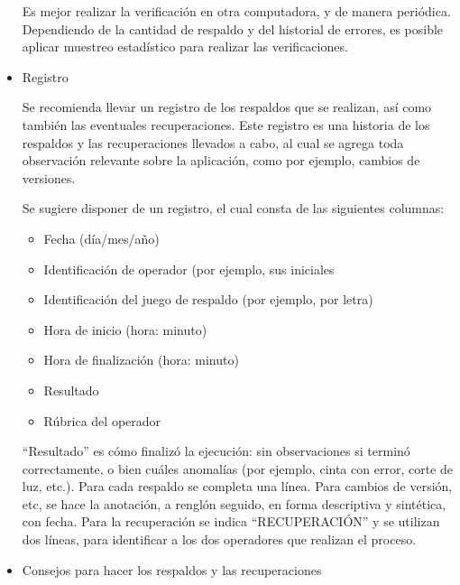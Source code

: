 \documentclass[a4paper,openright,12pt]{book}
\begin{document}
\begin{itemize}
Es mejor realizar la verificación en otra computadora, y de manera periódica. Dependiendo de la cantidad de respaldo y del historial de errores, es posible aplicar muestreo estadístico para realizar las verificaciones. 

\item Registro
 
Se recomienda llevar un registro de los respaldos que se realizan, así como también las eventuales recuperaciones. Este registro es una historia de los respaldos y las recuperaciones llevados a cabo, al cual se agrega toda observación relevante sobre la aplicación, como por ejemplo, cambios de versiones. 
 
Se sugiere disponer de un registro, el cual consta de las siguientes columnas: 
\begin{itemize}


\item Fecha (día/mes/año)
\item Identificación de operador (por ejemplo, sus iniciales
\item Identificación del juego de respaldo (por ejemplo, por letra) 
\item Hora de inicio (hora: minuto)
\item Hora de finalización (hora: minuto)
\item Resultado
\item Rúbrica del operador 
\end{itemize}
“Resultado” es cómo finalizó la ejecución: sin observaciones si terminó correctamente, o bien cuáles anomalías (por ejemplo, cinta con error, corte de luz, etc.). Para cada respaldo se completa una línea. Para cambios de versión, etc, se hace la anotación, a renglón seguido, en forma descriptiva y sintética, con fecha. Para la recuperación se indica “RECUPERACIÓN” y se utilizan dos líneas, para identificar a los dos operadores que realizan el proceso.  

\item Consejos para hacer los respaldos y las recuperaciones 




\end{itemize}
\end{document}

